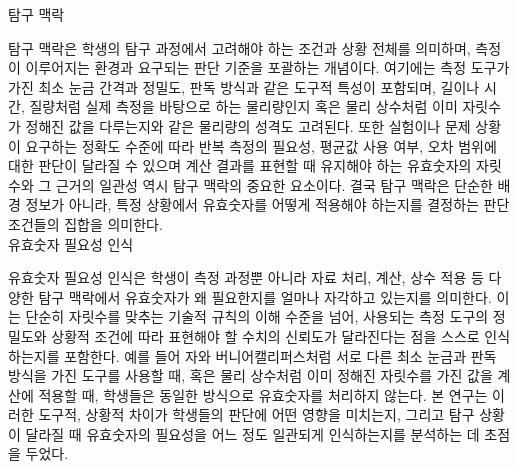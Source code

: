 \ganada 탐구 맥락

탐구 맥락은 학생의 탐구 과정에서 고려해야 하는 조건과 상황 전체를 의미하며,
측정이 이루어지는 환경과 요구되는 판단 기준을 포괄하는 개념이다.
%
여기에는 측정 도구가 가진 최소 눈금 간격과 정밀도, 판독 방식과 같은 도구적 특성이 포함되며,
길이나 시간, 질량처럼 실제 측정을 바탕으로 하는 물리량인지 혹은 물리 상수처럼
이미 자릿수가 정해진 값을 다루는지와 같은 물리량의 성격도 고려된다.
%
또한 실험이나 문제 상황이 요구하는 정확도 수준에 따라 반복 측정의 필요성,
평균값 사용 여부, 오차 범위에 대한 판단이 달라질 수 있으며 계산 결과를 표현할 때
유지해야 하는 유효숫자의 자릿수와 그 근거의 일관성 역시 탐구 맥락의 중요한 요소이다.
%
결국 탐구 맥락은 단순한 배경 정보가 아니라,
특정 상황에서 유효숫자를 어떻게 적용해야 하는지를 결정하는 판단 조건들의 집합을 의미한다. \\

\ganada 유효숫자 필요성 인식

유효숫자 필요성 인식은 학생이 측정 과정뿐 아니라 자료 처리, 계산, 상수 적용 등
다양한 탐구 맥락에서 유효숫자가 왜 필요한지를 얼마나 자각하고 있는지를 의미한다.
%
이는 단순히 자릿수를 맞추는 기술적 규칙의 이해 수준을 넘어, 사용되는 측정 도구의 정밀도와
상황적 조건에 따라 표현해야 할 수치의 신뢰도가 달라진다는 점을 스스로 인식하는지를 포함한다.
%
예를 들어 자와 버니어캘리퍼스처럼 서로 다른 최소 눈금과 판독 방식을 가진 도구를 사용할 때,
혹은 물리 상수처럼 이미 정해진 자릿수를 가진 값을 계산에 적용할 때,
학생들은 동일한 방식으로 유효숫자를 처리하지 않는다.
%
본 연구는 이러한 도구적, 상황적 차이가 학생들의 판단에 어떤 영향을 미치는지,
그리고 탐구 상황이 달라질 때 유효숫자의 필요성을 어느 정도 일관되게
인식하는지를 분석하는 데 초점을 두었다.